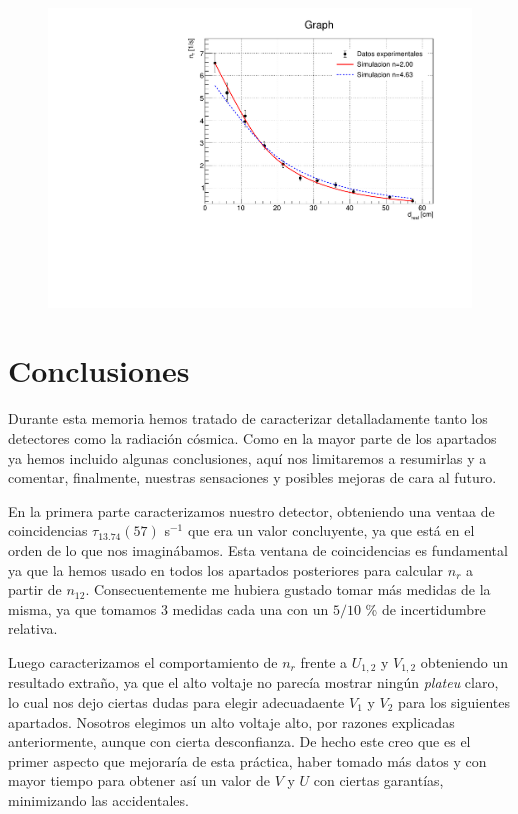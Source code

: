 \documentclass[11pt]{article}
\begin{document}
\begin{figure}[h!]
	\centering
	\label{Fig:montecarlo}
	\includegraphics[width=0.7\linewidth]{../Graficas/Montecarlo.pdf}
\end{figure}



\section{Conclusiones}

Durante esta memoria hemos tratado de caracterizar detalladamente tanto los detectores como la radiación cósmica. Como en la mayor parte de los apartados ya hemos incluido algunas conclusiones, aquí nos limitaremos a resumirlas y a comentar, finalmente, nuestras sensaciones y posibles mejoras de cara al futuro. 

En la primera parte caracterizamos nuestro detector, obteniendo una ventaa de coincidencias $\tau_13.74(57)$ s$^{-1}$ que era un valor concluyente, ya que está en el orden de lo que nos imaginábamos. Esta ventana de coincidencias es fundamental ya que la hemos usado en todos los apartados posteriores para calcular $n_r$ a partir de $n_{12}$. Consecuentemente me hubiera gustado tomar más medidas de la misma, ya que tomamos 3 medidas cada una con un $5/10$ \% de incertidumbre relativa. 

Luego caracterizamos el comportamiento de $n_r$ frente a $U_{1,2}$ y $V_{1,2}$ obteniendo un resultado extraño, ya que el alto voltaje no parecía mostrar ningún \textit{plateu} claro, lo cual nos dejo ciertas dudas para elegir adecuadaente $V_1$ y $V_2$ para los siguientes apartados. Nosotros elegimos un alto voltaje alto, por razones explicadas anteriormente, aunque con cierta desconfianza. De hecho este creo que es el primer aspecto que mejoraría de esta práctica, haber tomado más datos y con mayor tiempo para obtener así un valor de $V$ y $U$ con ciertas garantías, minimizando las accidentales.
\end{document}
